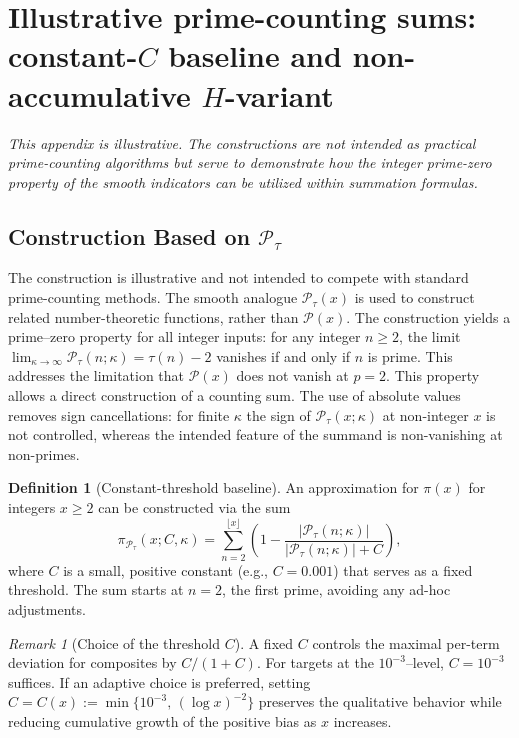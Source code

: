 \documentclass[11pt,a4paper]{amsart}
\theoremstyle{plain}
\theoremstyle{definition}
\newtheorem{definition}[theorem]{Definition}
\theoremstyle{remark}
\newtheorem{remark}[theorem]{Remark}
\begin{document}
\appendix

\section{Illustrative prime-counting sums: constant-$C$ baseline and non-accumulative $H$-variant}

\noindent\textit{This appendix is illustrative. The constructions are not intended as practical prime-counting algorithms but serve to demonstrate how the integer prime-zero property of the smooth indicators can be utilized within summation formulas.}

\subsection{Construction Based on $\mathcal{P}_{\tau}$}
The construction is illustrative and not intended to compete with standard prime-counting methods.
The smooth analogue $\mathcal{P}_{\tau}(x)$ is used to construct related number-theoretic functions, rather than $\mathcal{P}(x)$.
The construction yields a prime–zero property for all integer inputs: for any integer $n \ge 2$, the limit $\lim_{\kappa\to\infty} \mathcal{P}_{\tau}(n;\kappa)=\tau(n)-2$ vanishes if and only if $n$ is prime.
This addresses the limitation that $\mathcal{P}(x)$ does not vanish at $p=2$.
This property allows a direct construction of a counting sum. The use of absolute values removes sign cancellations: for finite $\kappa$ the sign of $\mathcal{P}_{\tau}(x;\kappa)$ at non-integer $x$ is not controlled, whereas the intended feature of the summand is non-vanishing at non-primes.

\begin{definition}[Constant-threshold baseline]
An approximation for $\pi(x)$ for integers $x\ge2$ can be constructed via the sum
\begin{equation}\label{eq:pi_P_tau}
\pi_{\mathcal{P}_\tau}(x; C, \kappa) = \sum_{n=2}^{\lfloor x \rfloor} \left(1 - \frac{|\mathcal{P}_{\tau}(n; \kappa)|}{|\mathcal{P}_{\tau}(n; \kappa)| + C}\right),
\end{equation}
where $C$ is a small, positive constant (e.g., $C=0.001$) that serves as a fixed threshold.
The sum starts at $n=2$, the first prime, avoiding any ad-hoc adjustments.
\end{definition}

\begin{remark}[Choice of the threshold $C$]
A fixed $C$ controls the maximal per-term deviation for composites by $C/(1+C)$. For targets at the $10^{-3}$–level, $C=10^{-3}$ suffices. If an adaptive choice is preferred, setting $C=C(x):=\min\{10^{-3},\,(\log x)^{-2}\}$ preserves the qualitative behavior while reducing cumulative growth of the positive bias as $x$ increases.
\end{remark}
\end{document}
